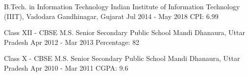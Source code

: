 
\begin{cventries}

  \cventry
    {B.Tech. in Information Technology}
    {Indian Institute of Information Technology (IIIT), Vadodara }
    {Gandhinagar, Gujarat}
    {Jul 2014 - May 2018}
    {CPI: 6.99}


  \cventry
    {Class XII - CBSE}
    {M.S. Senior Secondary Public School}
    {Mandi Dhanaura, Uttar Pradesh}
    {Apr 2012 - Mar 2013}
    {Percentage: 82}


  \cventry
    {Class X - CBSE}
    {M.S. Senior Secondary Public School}
    {Mandi Dhanaura, Uttar Pradesh}
    {Apr 2010 - Mar 2011}
    {CGPA: 9.6}
    
    
\end{cventries}
